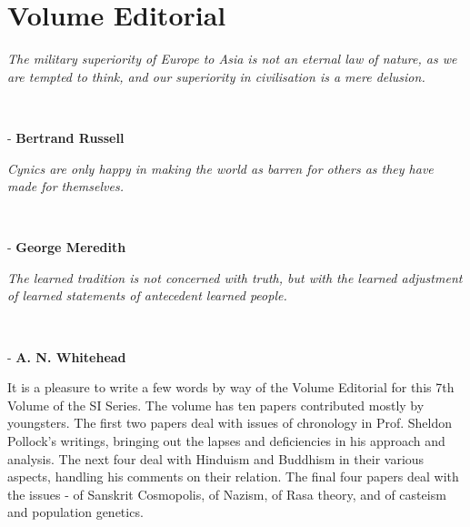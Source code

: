 
\chapter*{Volume Editorial}\label{volumeeditorial}

\begin{myquote}
\textit{The military superiority of Europe to Asia is not an eternal law of nature, as we are tempted to think, and our superiority in civilisation is a mere delusion.}
\end{myquote}
~
\vspace{-0.9cm}
\begin{flushright}
- \textbf{Bertrand Russell}
\end{flushright}

\begin{myquote}
\textit{Cynics are only happy in making the world as barren for others as they have made for themselves.}
\end{myquote}
~
\vspace{-0.9cm}
\begin{flushright}
- \textbf{George Meredith}
\end{flushright}

\begin{myquote}
\textit{The learned tradition is not concerned with truth, but with the learned adjustment of learned statements of antecedent learned people.}
\end{myquote}
~
\vspace{-0.9cm}
\begin{flushright}
- \textbf{A. N. Whitehead}
\end{flushright}

It is a pleasure to write a few words by way of the Volume Editorial for this 7th Volume of the SI Series. The volume has ten papers contributed mostly by youngsters. The first two papers deal with issues of chronology in Prof. Sheldon Pollock’s writings, bringing out the lapses and deficiencies in his approach and analysis. The next four deal with Hinduism and Buddhism in their various aspects, handling his comments on their relation. The final four papers deal with the issues - of Sanskrit Cosmopolis, of Nazism, of Rasa theory, and of casteism and population genetics.

